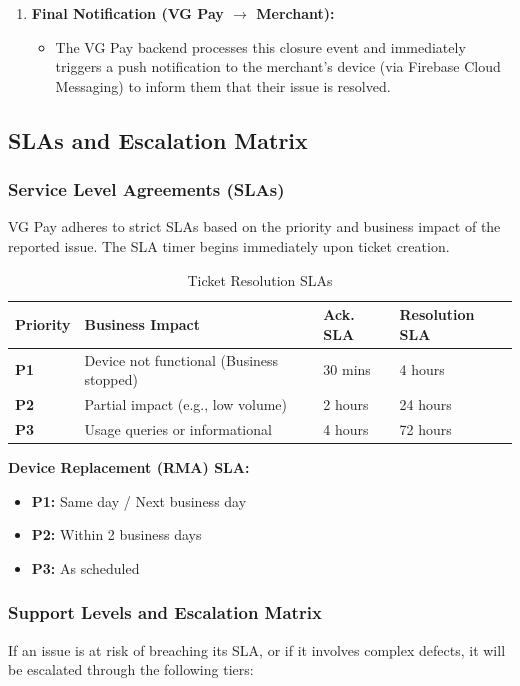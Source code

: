 \documentclass[11pt,a4paper]{article}
\begin{document}
\begin{enumerate}
    \item \textbf{Final Notification (VG Pay $\rightarrow$ Merchant):}
    \begin{itemize}
        \item The VG Pay backend processes this closure event and immediately triggers a push notification to the merchant's device (via Firebase Cloud Messaging) to inform them that their issue is resolved.
    \end{itemize}
\end{enumerate}

\subsection{SLAs and Escalation Matrix}

\subsubsection{Service Level Agreements (SLAs)}
VG Pay adheres to strict SLAs based on the priority and business impact of the reported issue. The SLA timer begins immediately upon ticket creation.

\begin{table}[H]
    \centering
    \begin{tabular}{|l|l|l|l|}
        \hline
        \textbf{Priority} & \textbf{Business Impact} & \textbf{Ack. SLA} & \textbf{Resolution SLA} \\ \hline
        \textbf{P1} & Device not functional (Business stopped) & 30 mins & 4 hours \\ \hline
        \textbf{P2} & Partial impact (e.g., low volume) & 2 hours & 24 hours \\ \hline
        \textbf{P3} & Usage queries or informational & 4 hours & 72 hours \\ \hline
    \end{tabular}
    \caption{Ticket Resolution SLAs}
\end{table}

\textbf{Device Replacement (RMA) SLA:}
\begin{itemize}
    \item \textbf{P1:} Same day / Next business day
    \item \textbf{P2:} Within 2 business days
    \item \textbf{P3:} As scheduled
\end{itemize}

\subsubsection{Support Levels and Escalation Matrix}
If an issue is at risk of breaching its SLA, or if it involves complex defects, it will be escalated through the following tiers:
\end{document}
